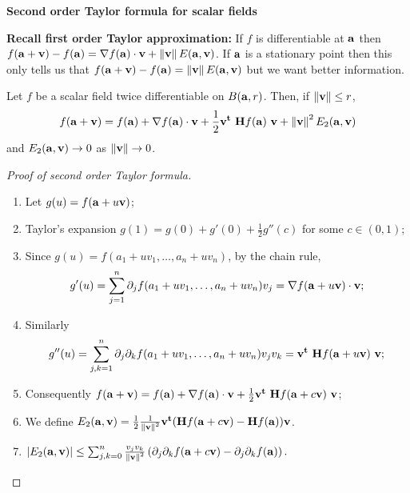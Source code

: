 \textbf{Second order Taylor formula for scalar fields}

\textbf{Recall first order Taylor approximation:}
If \(f\) is differentiable at \(\aa\)
then
\(  f(\aa+  \vv) - f(\aa)  = \nabla f(\aa) \cdot \vv + \norm{\vv}E(\aa,\vv)\).
If \(\aa\) is a stationary point then this only tells us that \(  f(\aa+  \vv) - f(\aa)  =  \norm{\vv}E(\aa,\vv)\) but we want better information.

\begin{theorem}
    Let \(f\) be a scalar field twice differentiable on \(B(\aa,r)\).
    Then, if \(\norm{\vv}\leq r\),
    \[
        f(\aa+\vv) = f(\aa) + \nabla f(\aa) \cdot \vv + \frac{1}{2} \vv^{\mathbf{t}} \ \mathbf{H} f (\aa) \ \vv + \norm{\vv}^2 E_2(\aa,\vv)
    \]
    and \(E_2(\aa,\vv) \to 0\) as \(\norm{\vv}\to 0\).
\end{theorem}




\begin{proof}[Proof of second order Taylor formula]

    \begin{enumerate}
        \item Let \(g(u) = f(\aa + u \vv)\);
        \item Taylor's expansion \(g(1) = g(0) + g'(0) + \frac{1}{2} g''(c)\) for some \(c\in (0,1)\);
        \item Since \(g(u) = f(a_1 + uv_1, \ldots, a_n + u v_n)\), by the chain rule,
              \[
                  g'(u) = \sum_{j=1}^{n} \partial_j f( a_1 + uv_1, \ldots, a_n + u v_n ) v_j
                  =\nabla f( \aa + u \vv) \cdot \vv;
              \]
              \vspace{-2em}
        \item Similarly
              \vspace{-1em}
              \[
                  g''(u) = \sum_{j,k=1}^{n} \partial_j\partial_k f( a_1 + uv_1, \ldots, a_n + u v_n ) v_j v_k
                  =  \vv^{\mathbf{t}} \ \mathbf{H} f (\aa + u \vv) \ \vv;
              \]
              \vspace{-1em}
        \item Consequently
              \(
              f(\aa+\vv) = f(\aa) + \nabla f(\aa) \cdot \vv + \frac{1}{2} \vv^{\mathbf{t}} \ \mathbf{H} f (\aa + c\vv) \ \vv
              \);
        \item We define \(E_2(\aa,\vv) = \frac{1}{2} \frac{1}{\norm{\vv}^2} \vv^{\mathbf{t}} (\mathbf{H} f (\aa + c\vv) - \mathbf{H} f (\aa)  ) \vv\).
        \item \(\abs{E_2(\aa,\vv)} \leq \sum_{j,k=0}^{n}
              \frac{v_j v_k}{\norm{\vv}^2} \left( \partial_{j}\partial_{k}f(\aa+c\vv)-\partial_{j}\partial_{k}f(\aa) \right).\)
              \qedhere
    \end{enumerate}
\end{proof}


